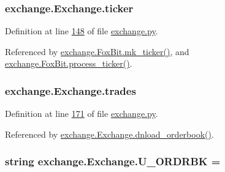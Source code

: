 \subsubsection[{\texorpdfstring{ticker}{ticker}}]{\setlength{\rightskip}{0pt plus 5cm}exchange.\+Exchange.\+ticker}\hypertarget{classexchange_1_1_exchange_a7cf9e52f993627955a2e242c388daaeb}{}\label{classexchange_1_1_exchange_a7cf9e52f993627955a2e242c388daaeb}


Definition at line \hyperlink{exchange_8py_source_l00148}{148} of file \hyperlink{exchange_8py_source}{exchange.\+py}.



Referenced by \hyperlink{exchange_8py_source_l00245}{exchange.\+Fox\+Bit.\+mk\+\_\+ticker()}, and \hyperlink{exchange_8py_source_l00224}{exchange.\+Fox\+Bit.\+process\+\_\+ticker()}.

\subsubsection[{\texorpdfstring{trades}{trades}}]{\setlength{\rightskip}{0pt plus 5cm}exchange.\+Exchange.\+trades}\hypertarget{classexchange_1_1_exchange_a30e87a377320ce05bd956fb014683641}{}\label{classexchange_1_1_exchange_a30e87a377320ce05bd956fb014683641}


Definition at line \hyperlink{exchange_8py_source_l00171}{171} of file \hyperlink{exchange_8py_source}{exchange.\+py}.



Referenced by \hyperlink{exchange_8py_source_l00182}{exchange.\+Exchange.\+dnload\+\_\+orderbook()}.

\subsubsection[{\texorpdfstring{U\+\_\+\+O\+R\+D\+R\+BK}{U_ORDRBK}}]{\setlength{\rightskip}{0pt plus 5cm}string exchange.\+Exchange.\+U\+\_\+\+O\+R\+D\+R\+BK = \textquotesingle{}\textquotesingle{}\hspace{0.3cm}{\ttfamily [static]}}\hypertarget{classexchange_1_1_exchange_a83174d2fe96a1c737231d3b8b18d9807}{}\label{classexchange_1_1_exchange_a83174d2fe96a1c737231d3b8b18d9807}


